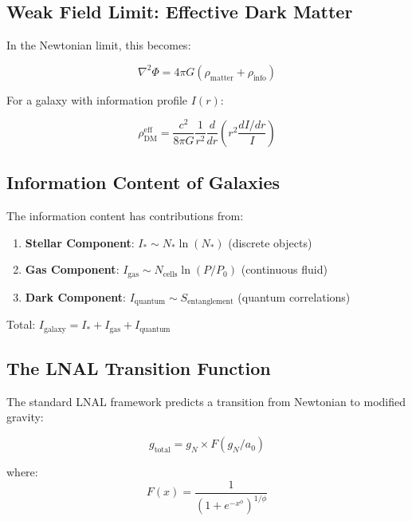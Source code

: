 \documentclass[12pt,letterpaper]{article}
\begin{document}
\subsection{Weak Field Limit: Effective Dark Matter}

In the Newtonian limit, this becomes:

\begin{equation}
\nabla^2\Phi = 4\pi G(\rho_{\text{matter}} + \rho_{\text{info}})
\end{equation}

For a galaxy with information profile $I(r)$:

\begin{equation}
\rho_{\text{DM}}^{\text{eff}} = \frac{c^2}{8\pi G}\frac{1}{r^2}\frac{d}{dr}\left(r^2\frac{dI/dr}{I}\right)
\end{equation}

\subsection{Information Content of Galaxies}

The information content has contributions from:

\begin{enumerate}
    \item \textbf{Stellar Component}: $I_* \sim N_* \ln(N_*)$ (discrete objects)
    \item \textbf{Gas Component}: $I_{\text{gas}} \sim N_{\text{cells}} \ln(P/P_0)$ (continuous fluid)
    \item \textbf{Dark Component}: $I_{\text{quantum}} \sim S_{\text{entanglement}}$ (quantum correlations)
\end{enumerate}

Total: $I_{\text{galaxy}} = I_* + I_{\text{gas}} + I_{\text{quantum}}$

\subsection{The LNAL Transition Function}

The standard LNAL framework predicts a transition from Newtonian to modified gravity:

\begin{equation}
g_{\text{total}} = g_N \times F(g_N/a_0)
\end{equation}

where:
\begin{equation}
F(x) = \frac{1}{(1 + e^{-x^\phi})^{1/\phi}}
\end{equation}
\end{document}
